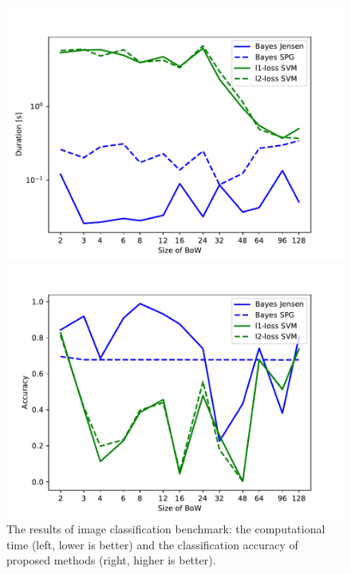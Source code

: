 \documentclass{aip-cp}
\begin{document}
\begin{figure}[h!]
    \centering
    \begin{minipage}{.5\textwidth}
        \centering
        \includegraphics[width=\textwidth]{Figures/times.pdf}
    \end{minipage}%
    \begin{minipage}{.5\textwidth}
        \centering
        \includegraphics[width=\textwidth]{Figures/score.pdf}
    \end{minipage}
    \caption{The results of image classification benchmark: the computational time (left, lower is better) and the classification accuracy of proposed methods (right, higher is better).}
    \label{fig:results:graph}
\end{figure}
\end{document}
